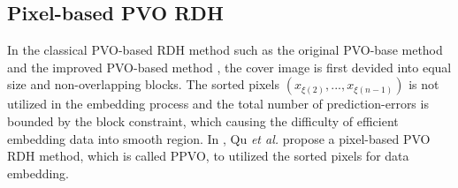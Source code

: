 \documentclass[review,3p,10pt,sort&compress]{elsarticle}
\begin{document}
\subsection{Pixel-based PVO RDH \cite{Qu2015PPVO}}\label{sec:2.2}
In the classical PVO-based RDH method such as the original PVO-base method \cite{Li2013PVO} and the improved PVO-based method \cite{Peng2014IPVO}, the cover image is first devided into equal size and non-overlapping blocks. The sorted pixels $(x_{\xi(2)},...,x_{\xi(n-1)})$ is not utilized in the embedding process and the total number of prediction-errors is bounded by the block constraint, which causing the difficulty of efficient embedding data into smooth region. In \cite{Qu2015PPVO}, Qu \emph{et al.} propose a pixel-based PVO RDH method, which is called PPVO, to utilized the sorted pixels for data embedding.
\end{document}
